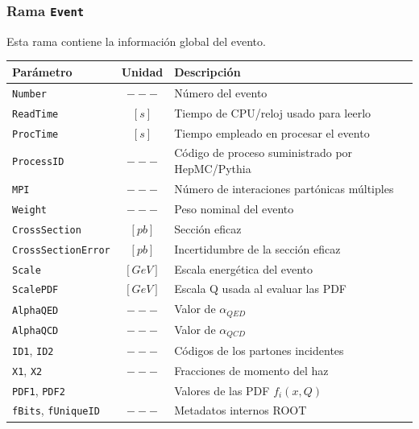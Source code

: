         \subsubsection{Rama \texttt{Event}}
        Esta rama contiene la información global del evento.
        \begin{table}[H]
            \begin{center}
                \begin{tabular}{|l|c|l|}\hline
                    \textbf{Parámetro} & \textbf{Unidad} & \textbf{Descripción} \\\hline\hline
                    \texttt{Number} & $---$ & Número del evento \\\hline
                    \texttt{ReadTime} & $[s]$ & Tiempo de CPU/reloj usado para leerlo \\\hline
                    \texttt{ProcTime} & $[s]$ & Tiempo empleado en procesar el evento \\\hline
                    \texttt{ProcessID} & $---$ & Código de proceso suministrado por HepMC/Pythia \\\hline
                    \texttt{MPI} & $---$ & Número de interaciones partónicas múltiples \\\hline
                    \texttt{Weight} & $---$ & Peso nominal del evento \\\hline
                    \texttt{CrossSection} & $[pb]$ & Sección eficaz \\\hline
                    \texttt{CrossSectionError} & $[pb]$ & Incertidumbre de la sección eficaz \\\hline
                    \texttt{Scale} & $[GeV]$ & Escala energética del evento \\\hline
                    \texttt{ScalePDF} & $[GeV]$ & Escala Q usada al evaluar las PDF \\\hline
                    \texttt{AlphaQED} & $---$ & Valor de $\alpha_{QED}$ \\\hline
                    \texttt{AlphaQCD} & $---$ & Valor de $\alpha_{QCD}$ \\\hline
                    \texttt{ID1}, \texttt{ID2} & $---$ & Códigos de los partones incidentes \\\hline
                    \texttt{X1}, \texttt{X2} & $---$ & Fracciones de momento del haz \\\hline
                    \texttt{PDF1}, \texttt{PDF2} &  & Valores de las PDF $f_{i}(x,Q)$ \\\hline
                    \texttt{fBits}, \texttt{fUniqueID} & $---$ & Metadatos internos ROOT \\\hline
                \end{tabular}
            \end{center}
        \end{table}
